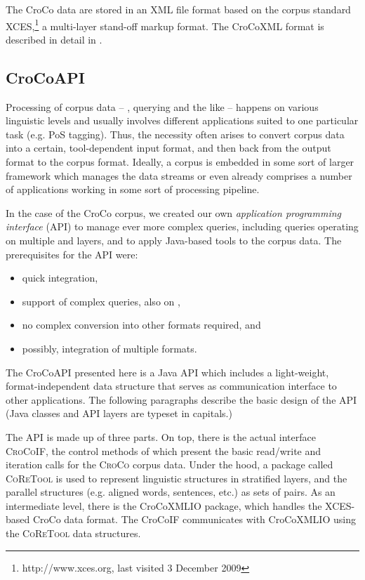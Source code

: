 \documentclass[output=paper]{LSP/langsci}
\begin{document}
The CroCo data are stored in an XML file format based on the corpus  standard XCES,\footnote{http://www.xces.org, last visited 3 December 2009} a multi-layer stand-off markup format. The CroCoXML format is described in detail in \citet{Hansen-SchirraEtAl2006,Hansen-Schirra2012}.

\subsection{CroCoAPI}\label{sec:culo:3.2}

Processing of corpus data -- , querying and the like -- happens on various linguistic levels and usually involves different applications suited to one particular task (e.g. PoS tagging). Thus, the necessity often arises to convert corpus data into a certain, tool-dependent input format, and then back from the output format to the corpus format. Ideally, a corpus is embedded in some sort of larger framework which manages the data streams or even already comprises a number of applications working in some sort of processing pipeline.

In the case of the CroCo corpus, we created our own \textit{application programming interface} (API) to manage ever more complex queries, including queries operating on multiple  and  layers, and to apply Java-based  tools to the corpus data. The prerequisites for the API were:


\begin{itemize}
\item  
quick integration,
\item  
support of complex queries, also on , 
\item  
no complex conversion into other formats required, and
\item  
possibly, integration of multiple formats.
\end{itemize}

The CroCoAPI presented here is a Java API which includes a light-weight, format-independent data structure that serves as communication interface to other applications. The following paragraphs describe the basic design of the API (Java classes and API layers are typeset in capitals.)

The API is made up of three parts. On top, there is the actual interface \textsc{CroCoIF}, the control methods of which present the basic read/write and iteration calls for the \textsc{CroCo} corpus data. Under the hood, a package called \textsc{CoReTool} is used to represent linguistic structures in stratified layers, and the parallel structures (e.g. aligned words, sentences, etc.) as sets of pairs. As an intermediate level, there is the CroCoXMLIO package, which handles the XCES-based CroCo data format. The CroCoIF communicates with CroCoXMLIO using the \textsc{CoReTool} data structures.
\end{document}
